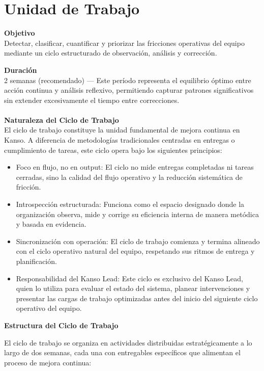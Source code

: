\section{Unidad de Trabajo}


\textbf{Objetivo}\\
Detectar, clasificar, cuantificar y priorizar las fricciones operativas del equipo mediante un ciclo estructurado de observación, análisis y corrección.

\textbf{Duración}\\
2 semanas (recomendado) — Este período representa el equilibrio óptimo entre acción continua y análisis reflexivo, permitiendo capturar patrones significativos sin extender excesivamente el tiempo entre correcciones.
\\ 
\\ 
\textbf{Naturaleza del Ciclo de Trabajo}
\\ 
El ciclo de trabajo constituye la unidad fundamental de mejora continua en Kanso. A diferencia de metodologías tradicionales centradas en entregas o cumplimiento de tareas, este ciclo opera bajo los siguientes principios:

\begin{itemize}
    \item Foco en flujo, no en output: El ciclo no mide entregas completadas ni tareas cerradas, sino la calidad del flujo operativo y la reducción sistemática de fricción.
    \item Introspección estructurada: Funciona como el espacio designado donde la organización observa, mide y corrige su eficiencia interna de manera metódica y basada en evidencia.
    \item Sincronización con operación: El ciclo de trabajo comienza y termina alineado con el ciclo operativo natural del equipo, respetando sus ritmos de entrega y planificación.
    \item Responsabilidad del Kanso Lead: Este ciclo es exclusivo del Kanso Lead, quien lo utiliza para evaluar el estado del sistema, planear intervenciones y presentar las cargas de trabajo optimizadas antes del inicio del siguiente ciclo operativo del equipo.
\end{itemize}

\textbf{Estructura del Ciclo de Trabajo}

El ciclo de trabajo se organiza en actividades distribuidas estratégicamente a lo largo de dos semanas, cada una con entregables específicos que alimentan el proceso de mejora continua:

